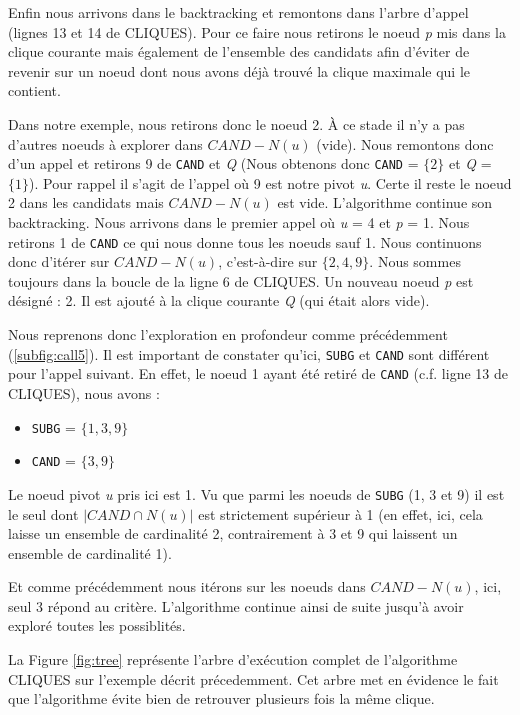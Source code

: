 \documentclass[12pt,a4paper]{article}
\begin{document}
Enfin nous arrivons dans le backtracking et remontons dans l'arbre d'appel (lignes 13 et 14 de CLIQUES). Pour ce faire nous retirons le noeud \emph{p} mis dans la clique courante mais également de l'ensemble des candidats afin d'éviter de revenir sur un noeud dont nous avons déjà trouvé la clique maximale qui le contient.

Dans notre exemple, nous retirons donc le noeud 2. À ce stade il n'y a pas d'autres noeuds à explorer dans \(CAND - N(u)\) (vide). Nous remontons donc d'un appel et retirons 9 de \texttt{CAND} et \emph{Q} (Nous obtenons donc \texttt{CAND} = \(\{2\}\) et \emph{Q} = \(\{1\}\)). Pour rappel il s'agit de l'appel où 9 est notre pivot \emph{u}. Certe il reste le noeud 2 dans les candidats mais \(CAND - N(u)\) est vide.
L'algorithme continue son backtracking. Nous arrivons dans le premier appel où \emph{u} = 4 et \emph{p} = 1. Nous retirons 1 de \texttt{CAND} ce qui nous donne tous les noeuds sauf 1. Nous continuons donc d'itérer sur \(CAND - N(u)\), c'est-à-dire sur \(\{2, 4, 9\}\). Nous sommes toujours dans la boucle de la ligne 6 de CLIQUES. Un nouveau noeud \emph{p} est désigné : 2. Il est ajouté à la clique courante \emph{Q} (qui était alors vide).

Nous reprenons donc l'exploration en profondeur comme précédemment (\ref{subfig:call5}). Il est important de constater qu'ici, \texttt{SUBG} et \texttt{CAND} sont différent pour l'appel suivant. En effet, le noeud 1 ayant été retiré de \texttt{CAND} (c.f. ligne 13 de CLIQUES), nous avons :

\begin{itemize}
  \item \texttt{SUBG} = \(\{1, 3, 9\}\)
  \item \texttt{CAND} = \(\{3, 9\}\)
\end{itemize}
Le noeud pivot \emph{u} pris ici est 1. Vu que parmi les noeuds de \texttt{SUBG} (1, 3 et 9) il est le seul dont \(|CAND \cap N(u)|\) est strictement supérieur à 1 (en effet, ici, cela laisse un ensemble de cardinalité 2, contrairement à 3 et 9 qui laissent un ensemble de cardinalité 1).

Et comme précédemment nous itérons sur les noeuds dans \(CAND - N(u)\), ici, seul 3 répond au critère. L'algorithme continue ainsi de suite jusqu'à avoir exploré toutes les possiblités.

La Figure \ref{fig:tree} représente l'arbre d'exécution complet de l'algorithme CLIQUES sur l'exemple décrit précedemment. Cet arbre met en évidence le fait que l'algorithme évite bien de retrouver plusieurs fois la même clique.
\end{document}
